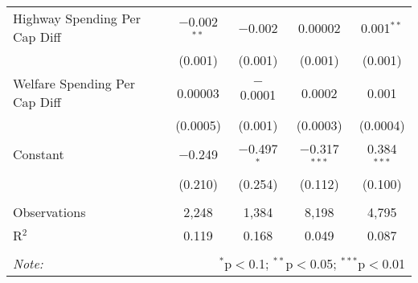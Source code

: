 \begin{table}[!htbp]
\begin{tabular}{@{\extracolsep{5pt}}lcccc}
  Highway Spending Per Cap Diff & $-$0.002$^{**}$ & $-$0.002 & 0.00002 & 0.001$^{**}$ \\ 
  & (0.001) & (0.001) & (0.001) & (0.001) \\ 
  Welfare Spending Per Cap Diff & 0.00003 & $-$0.0001 & 0.0002 & 0.001 \\ 
  & (0.0005) & (0.001) & (0.0003) & (0.0004) \\ 
  Constant & $-$0.249 & $-$0.497$^{*}$ & $-$0.317$^{***}$ & 0.384$^{***}$ \\ 
  & (0.210) & (0.254) & (0.112) & (0.100) \\ 
 \hline \\[-1.8ex] 
Observations & 2,248 & 1,384 & 8,198 & 4,795 \\ 
R$^{2}$ & 0.119 & 0.168 & 0.049 & 0.087 \\ 
\hline 
\hline \\[-1.8ex] 
\textit{Note:}  & \multicolumn{4}{r}{$^{*}$p$<$0.1; $^{**}$p$<$0.05; $^{***}$p$<$0.01} \\ 
\end{tabular} 
\end{table} 
